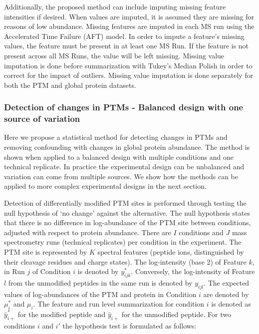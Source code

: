 \documentclass[mcp]{article}
\numberwithin{figure}{section} %
\numberwithin{table}{section}
\begin{document}
Additionally, the proposed method can include imputing missing feature intensities if desired. When values are imputed, it is assumed they are missing for reasons of low abundance. Missing features are imputed in each MS run using the Accelerated Time Failure (AFT) model\cite{Tukey:1977}. In order to impute a feature's missing values, the feature must be present in at least one MS Run. If the feature is not present across all MS Runs, the value will be left missing. Missing value imputation is done before summarization with Tukey's Median Polish in order to correct for the impact of outliers. Missing value imputation is done separately for both the PTM and global protein datasets.

\subsubsection*{Detection of changes in PTMs - Balanced design with one source of variation}
\label{sec:adjustment_summary}

Here we propose a statistical method for detecting changes in PTMs and removing confounding with changes in global protein abundance. The method is shown when applied to a balanced design with multiple conditions and one technical replicate. In practice the experimental design can be unbalanced and variation can come from multiple sources. We show how the methods can be applied to more complex experimental designs in the next section.

Detection of differentially modified PTM sites is performed through testing the null hypothesis of ‘no change’ against the alternative. The null hypothesis states that there is no difference in log-abundance of the PTM site between conditions, adjusted with respect to protein abundance. There are $I$ conditions and $J$ mass spectrometry runs (technical replicates) per condition in the experiment. The PTM site is represented by $K$ spectral features (peptide ions, distinguished by their cleavage residues and charge states). The log-intensity (base 2) of Feature $k$, in Run $j$ of Condition $i$ is denoted by $y_{ijk}^{\ast}$. Conversely, the log-intensity of Feature $l$ from the unmodified peptides in the same run is denoted by $y_{ijl}$. The expected values of log-abundances of the PTM and protein in Condition $i$ are denoted by $\mu_{i}^{\ast}$ and $\mu_{i}$. The feature and run level summarization for condition $i$ is denoted as $\hat{y}_{i+}^{\ast}$ for the modified peptide and $\hat{y}_{i+}$ for the unmodified peptide. For two conditions $i$ and $i'$ the hypothesis test is formulated as follows:
\end{document}
